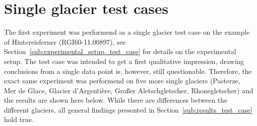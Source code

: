 
\chapter{Single glacier test cases}\label{appendix_A}
\thispagestyle{plain}

The first experiment was performend as a single glacier test case on the example of Hintereisferner (RGI60-11.00897), see Section~\ref{sub:experimental_setup_test_case} for details on the experimental setup. The test case was intended to get a first qualitative impression, drawing conclusions from a single data point is, however, still questionable. Therefore, the exact same experiment was performend on five more single glaciers (Pasterze, Mer de Glace, Glacier d'Argentière, Großer Aletschgletscher, Rhonegletscher) and the results are shown here below. While there are differences between the different glaciers, all general findings presented in Section~\ref{sub:results_test_case} hold true.

